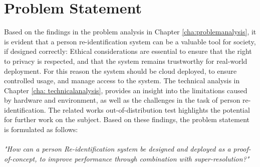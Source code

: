 \chapter{Problem Statement} \label{cha: problemstatement}

Based on the findings in the problem analysis in Chapter \ref{cha:problemanalysis}, it is evident that a person re-identification system can be a valuable tool for society, if designed correctly: Ethical considerations are essential to ensure that the right to privacy is respected, and that the system remains trustworthy for real-world deployment. For this reason the system should be cloud deployed, to ensure controlled usage, and manage access to the system. 
The technical analysis in Chapter \ref{cha: technicalanalysis}, provides an insight into the limitations caused by hardware and environment, as well as the challenges in the task of person re-identification. The related works out-of-distribution test highlights the potential for further work on the subject. Based on these findings, the problem statement is formulated as follows:
\\\\
\textit{"How can a person Re-identification system be designed and deployed as a proof-of-concept, to improve performance through combination with super-resolution?"}



